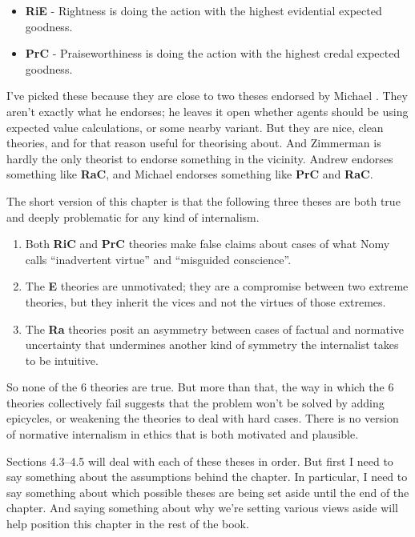 \begin{itemize}
\item{} \textbf{RiE} - Rightness is doing the action with the highest evidential expected goodness.

\item{} \textbf{PrC} - Praiseworthiness is doing the action with the highest credal expected goodness.

\end{itemize}
I've picked these because they are close to two theses endorsed by Michael \citet{Zimmerman2008}. They aren't exactly what he endorses; he leaves it open whether agents should be using expected value calculations, or some nearby variant. But they are nice, clean theories, and for that reason useful for theorising about. And Zimmerman is hardly the only theorist to endorse something in the vicinity. Andrew \citet{Sepielli2009} endorses something like \textbf{RaC}, and Michael \citet{Smith2006, Smith2009} endorses something like \textbf{PrC} and \textbf{RaC}.

The short version of this chapter is that the following three theses are both true and deeply problematic for any kind of internalism.

\begin{enumerate}
\item{} Both \textbf{RiC} and \textbf{PrC} theories make false claims about cases of what Nomy \citet[10]{Arpaly2003} calls ``inadvertent virtue'' and ``misguided conscience''.

\item{} The \textbf{E} theories are unmotivated; they are a compromise between two extreme theories, but they inherit the vices and not the virtues of those extremes.

\item{} The \textbf{Ra} theories posit an asymmetry between cases of factual and normative uncertainty that undermines another kind of symmetry the internalist takes to be intuitive.

\end{enumerate}
So none of the 6 theories are true. But more than that, the way in which the 6 theories collectively fail suggests that the problem won't be solved by adding epicycles, or weakening the theories to deal with hard cases. There is no version of normative internalism in ethics that is both motivated and plausible.

Sections 4.3--4.5 will deal with each of these theses in order. But first I need to say something about the assumptions behind the chapter. In particular, I need to say something about which possible theses are being set aside until the end of the chapter. And saying something about why we're setting various views aside will help position this chapter in the rest of the book.

